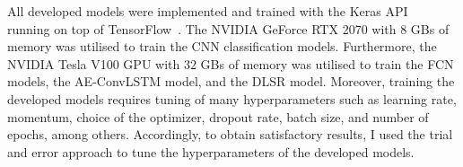 All developed models were implemented and trained with the Keras API~\cite{chollet2015keras} running on top of TensorFlow~\cite{Abadi2016}.
The NVIDIA GeForce RTX 2070 with \(8\) GBs of memory was utilised to train the CNN classification models.
Furthermore, the NVIDIA Tesla V100 GPU with \(32\) GBs of memory was utilised to train the FCN models, the AE-ConvLSTM model, and the DLSR model.
Moreover, training the developed models requires tuning of many hyperparameters such as learning rate, momentum, choice of the optimizer, dropout rate, batch size, and number of epochs, among others.
Accordingly, to obtain satisfactory results, I used the trial and error approach to tune the hyperparameters of the developed models.







